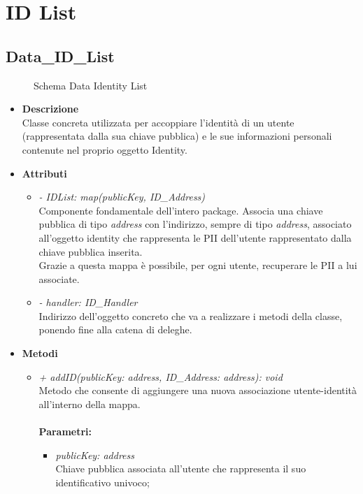 \section{ID List}
\subsection{Data\_ID\_List}
\begin{figure}[!h]
	\centering
	\caption{Schema Data Identity List}
\end{figure}
\begin{itemize}
	\item \textbf{Descrizione}\\
	Classe concreta utilizzata per accoppiare l'identità di un utente (rappresentata dalla sua chiave pubblica) e le sue informazioni personali contenute nel proprio oggetto Identity.
	\item \textbf{Attributi}
	\begin{itemize}
		\item \textit{- IDList: map(publicKey, ID\_Address)}\\
		Componente fondamentale dell'intero package. Associa una chiave pubblica di tipo \textit{address} con l'indirizzo, sempre di tipo \textit{address}, associato all'oggetto identity che rappresenta le \gls{PII} dell'utente rappresentato dalla chiave pubblica inserita.\\
		Grazie a questa mappa è possibile, per ogni utente, recuperare le \gls{PII} a lui associate.
		\item \textit{- handler: ID\_Handler}\\
		Indirizzo dell'oggetto concreto che va a realizzare i metodi della classe, ponendo fine alla catena di deleghe.		
	\end{itemize}
	\item \textbf{Metodi}
	\begin{itemize}
		\item \textit{+ addID(publicKey: address, ID\_Address: address): void}\\
		Metodo che consente di aggiungere una nuova associazione utente-identità all'interno della mappa.\\\\
		\textbf{Parametri:}
		\begin{itemize}
			\item \textit{publicKey: address}\\
			Chiave pubblica associata all'utente che rappresenta il suo identificativo univoco;

\end{itemize}
\end{itemize}
\end{itemize}
